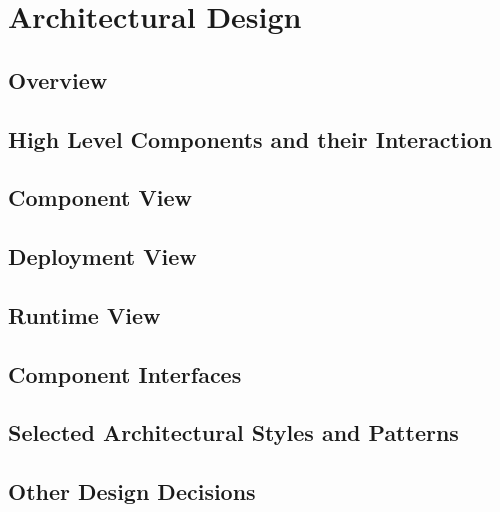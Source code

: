 \chapter{Architectural Design} \label{chap2}

\section{Overview}

\section{High Level Components and their Interaction}

\section{Component View}

\section{Deployment View}

\section{Runtime View}

\section{Component Interfaces}

\section{Selected Architectural Styles and Patterns}

\section{Other Design Decisions}
